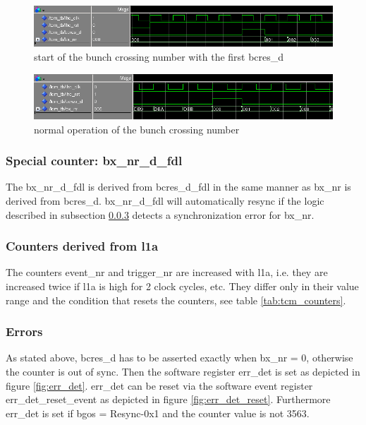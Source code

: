 \begin{figure}[ht]
  \includegraphics[width=1.0\textwidth]{./figures/bx_start}
  \caption{start of the bunch crossing number with the first bcres\_d}
  \label{fig:bx_start}
\end{figure}

\begin{figure}[ht]
  \includegraphics[width=1.0\textwidth]{./figures/bx_normal_operation}
  \caption{normal operation of the bunch crossing number}
  \label{fig:bx_normal_operation}
\end{figure}

\subsubsection{Special counter: bx\_nr\_d\_fdl}
The bx\_nr\_d\_fdl is derived from bcres\_d\_fdl in the same manner as bx\_nr is derived from bcres\_d. bx\_nr\_d\_fdl will automatically resync if the logic described in subsection \ref{subsec:tcmerrors} detects a synchronization error for bx\_nr.

\subsubsection{Counters derived from l1a}
The counters event\_nr and trigger\_nr are increased with l1a, i.e. they are increased twice if l1a is high for 2 clock cycles, etc. They differ only in their value range and the condition that resets the counters, see table \ref{tab:tcm_counters}.

\subsubsection{Errors}\label{subsec:tcmerrors}
As stated above, bcres\_d has to be asserted exactly when bx\_nr = 0, otherwise the counter is out of sync. Then the software register err\_det is set as depicted in figure \ref{fig:err_det}. err\_det can be reset via the software event register err\_det\_reset\_event as depicted in figure \ref{fig:err_det_reset}. Furthermore err\_det is set if bgos = Resync-0x1 and the counter value is not 3563.

